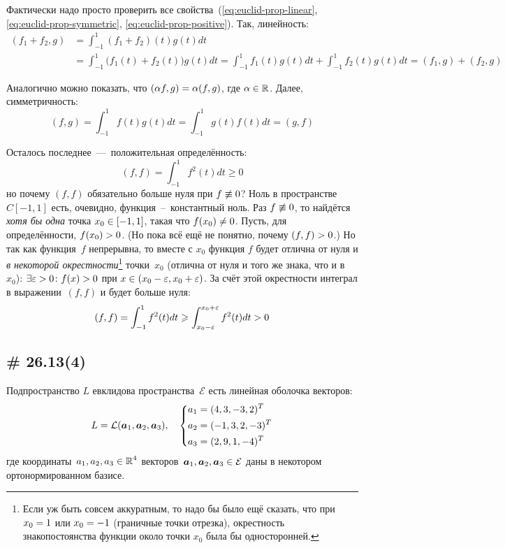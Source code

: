 \documentclass[a4paper,12pt]{article}
\begin{document}
  \begin{solution}
    Фактически надо просто проверить все свойства~(\ref{eq:euclid-prop-linear}, \ref{eq:euclid-prop-symmetric}, \ref{eq:euclid-prop-positive}).
    Так, линейность:
    \begin{equation}
    \begin{split}
      (f_1 + f_2, g) &= \int_{-1}^{1} (f_1 + f_2)(t) g(t) dt\\
      &= \int_{-1}^{1} \bigl(f_1(t) + f_2(t)\bigr) g(t) dt
      = \int_{-1}^{1} f_1(t) g(t) dt + \int_{-1}^{1} f_2(t) g(t) dt
      = (f_1, g) + (f_2, g)
    \end{split}
    \end{equation}
    
    Аналогично можно показать, что $(\alpha f, g) \hm= \alpha (f, g)$, где $\alpha \hm\in \RR$.
    Далее, симметричность:
    \[
      (f, g) = \int_{-1}^{1} f(t) g(t) dt
      = \int_{-1}^{1} g(t) f(t) dt
      = (g, f)
    \]
    
    Осталось последнее~---~положительная определённость:
    \[
      (f, f) = \int_{-1}^{1} f^2(t) dt \geq 0
    \]
    но почему $(f, f)$ обязательно больше нуля при $f \hm{\not\equiv} 0$?
    Ноль в пространстве $C[-1, 1]$ есть, очевидно, функция~--~константный ноль.
    Раз $f \hm{\not\equiv} 0$, то найдётся \emph{хотя бы одна} точка $x_0 \hm\in [-1, 1]$, такая что $f(x_0) \hm{\not=} 0$.
    Пусть, для определённости, $f(x_0) \hm> 0$.
    (Но пока всё ещё не понятно, почему $(f, f) \hm> 0$.)
    Но так как функция~$f$ непрерывна, то вместе с $x_0$ функция $f$ будет отлична от нуля и \emph{в некоторой окрестности}\footnote{Если уж быть совсем аккуратным, то надо бы было ещё сказать, что при $x_0 \hm= 1$ или $x_0 \hm= -1$ (граничные точки отрезка), окрестность знакопостоянства функции около точки $x_0$ была бы односторонней.} точки~$x_0$ (отлична от нуля и того же знака, что и в~$x_0$): $\exists \eps \hm> 0 \colon f(x) \hm> 0$ при $x \hm\in (x_0 \hm- \eps, x_0 \hm+ \eps)$.
    За счёт этой окрестности интеграл в выражении~$(f, f)$ и будет больше нуля:
    \[
      (f, f) = \int_{-1}^{1} f^2(t) dt \geqslant \int_{x_0 - \varepsilon}^{x_0 + \varepsilon} f^2(t) dt > 0
    \]
  \end{solution}
  
  
  \subsection{\# 26.13(4)}
  
  Подпространство $L$ евклидова пространства~$\mathcal E$ есть линейная оболочка векторов:
  \[
    L = \mathcal L(\boldsymbol a_1, \boldsymbol a_2, \boldsymbol a_3),
    \quad\left\{
      \begin{aligned}
        &a_1 = (4, 3, -3, 2)^T\\
        &a_2 = (-1, 3, 2, -3)^T\\
        &a_3 = (2, 9, 1, -4)^T
      \end{aligned}
    \right.
  \]
  где координаты~$a_1, a_2, a_3 \hm\in \RR^4$ векторов~$\bds a_1, \bds a_2, \bds a_3 \hm\in \mathcal E$ даны в некотором ортонормированном базисе.
  
\end{document}
